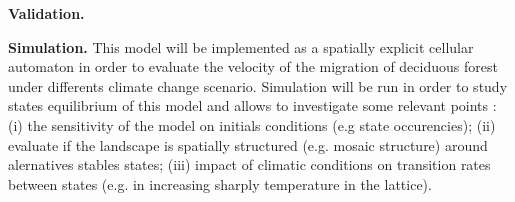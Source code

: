
\textbf{Validation.} 


\textbf{Simulation.} This model will be implemented as a spatially explicit
cellular automaton in order to evaluate the velocity of the
migration of deciduous forest under differents climate change scenario.
Simulation will be run in order to study states equilibrium of this model and
allows to investigate some relevant points : (i) the sensitivity of
the model on initials conditions (e.g state occurencies); (ii) evaluate if the
landscape is spatially structured (e.g. mosaic structure) around alernatives
stables states; (iii) impact of climatic conditions on transition rates
between states (e.g. in increasing sharply temperature in the lattice). \\



\clearpage
\small

